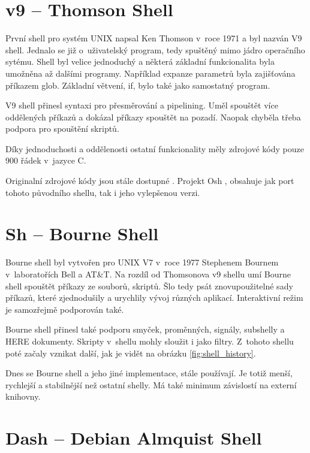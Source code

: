 \documentclass[thesis=M,czech]{FITthesis}[2012/06/26]
\begin{document}
\section{v9 -- Thomson Shell}

První shell pro systém UNIX napsal Ken Thomson v~roce 1971 a byl nazván V9 shell. Jednalo se již o~uživatelský program, tedy spuštěný mimo jádro operačního sytému. Shell byl velice jednoduchý a některá základní funkcionalita byla umožněna až dalšími programy. Například expanze parametrů byla zajišťována příkazem glob. Základní větvení, if, bylo také jako samostatný program.

V9 shell přinesl syntaxi pro přesměrování a pipelining. Uměl spouštět více oddělených příkazů a dokázal příkazy spouštět na pozadí. Naopak chyběla třeba podpora pro spouštění skriptů.

Díky jednoduchosti a oddělenosti ostatní funkcionality měly zdrojové kódy pouze 900 řádek v~jazyce C.

Originalní zdrojové kódy jsou stále dostupné \cite{thompsonshell}. Projekt Osh \cite{v6shell}, obsahuje jak port tohoto původního shellu, tak i jeho vylepšenou verzi.



%
%
%
\section{Sh -- Bourne Shell}

Bourne shell byl vytvořen pro UNIX V7 v~roce 1977 Stephenem Bournem v~laboratořích Bell a AT\&T. Na rozdíl od Thomsonova v9 shellu umí Bourne shell spouštět příkazy ze souborů, skriptů. Šlo tedy psát znovupoužitelné sady příkazů, které zjednodušily a urychlily vývoj různých aplikací. Interaktivní režim je samozřejmě podporován také.

Bourne shell přinesl také podporu smyček, proměnných, signály, subshelly a HERE dokumenty. Skripty v~shellu mohly sloužit i jako filtry. Z~tohoto shellu poté začaly vznikat další, jak je vidět na obrázku \ref{fig:shell_history}.

Dnes se Bourne shell a jeho jiné implementace, stále používají. Je totiž menší, rychlejší a stabilnější než ostatní shelly. Má také minimum závislostí na externí knihovny.

%
%
%
\section{Dash -- Debian Almquist Shell}
\end{document}
